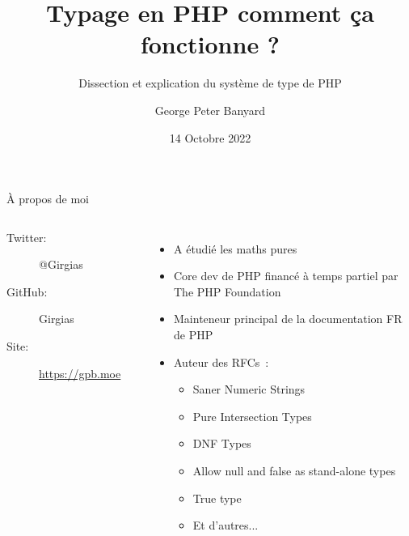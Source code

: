 \documentclass[10pt]{beamer}
\title{Typage en PHP comment ça fonctionne ?}
\subtitle{Dissection et explication du système de type de PHP}
\date{14 Octobre 2022}
\author{George Peter Banyard}
\institute{The PHP Foundation}
\begin{document}
\maketitle

\begin{frame}{À propos de moi}
    
    \begin{columns}[T,onlytextwidth]
            \begin{description}
                  \item[Twitter:] @Girgias
                 \item[GitHub:] Girgias
                  \item[Site:] \url{https://gpb.moe}
            \end{description}
            \begin{center}
                  
            \end{center}
            
            \begin{itemize}
                \item A étudié les maths pures
                \item Core dev de PHP financé à temps partiel par \alert{The PHP Foundation}
                \item Mainteneur principal de la documentation FR de PHP
                \item Auteur des RFCs~:
                    \begin{itemize}
                        \item Saner Numeric Strings \cite{banyard_saner_2020}
                        \item Pure Intersection Types \cite{banyard_pure_2021}
                        \item DNF Types \cite{banyard_disjunctive_2022}
                        \item Allow null and false as stand-alone types \cite{banyard_allow_2022}
                        \item True type \cite{banyard_add_2022}
                        \item Et d'autres...
                    \end{itemize}
            \end{itemize}
    \end{columns}
\end{frame}
\end{document}
